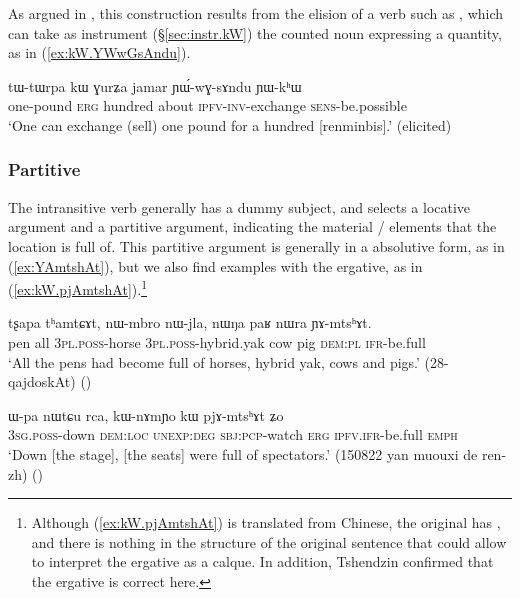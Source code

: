 As argued in \citet[23]{jacques16comparative}, this construction results from the elision of a verb such as , which can take as instrument (§\ref{sec:instr.kW}) the counted noun expressing a quantity, as in (\ref{ex:kW.YWwGsAndu}).


\begin{exe}
\ex \label{ex:kW.YWwGsAndu}
\gll tɯ-tɯrpa kɯ ɣurʑa jamar ɲɯ́-wɣ-sɤndu ɲɯ-kʰɯ \\
one-pound \textsc{erg} hundred about \textsc{ipfv}-\textsc{inv}-exchange \textsc{sens}-be.possible \\
\glt `One can exchange (sell) one pound for a hundred [renminbis].' (elicited)
\end{exe}

\subsubsection{Partitive} \label{sec:kW.mtshAt}
The intransitive verb  generally has a dummy subject, and selects a locative argument and a partitive argument, indicating the material / elements that the location is full of. This partitive argument is generally in a absolutive form, as in (\ref{ex:YAmtshAt}), but we also find examples with the ergative, as in (\ref{ex:kW.pjAmtshAt}).\footnote{Although (\ref{ex:kW.pjAmtshAt}) is translated from Chinese, the original has , and there is nothing in the structure of the original sentence that could allow to interpret the ergative as a calque. In addition, Tshendzin confirmed that the ergative is correct here. }

\begin{exe}
\ex \label{ex:YAmtshAt}
\gll tʂapa tʰamtɕɤt, nɯ-mbro nɯ-jla, nɯŋa paʁ nɯra ɲɤ-mtsʰɤt. \\
pen all \textsc{3pl}.\textsc{poss}-horse \textsc{3pl}.\textsc{poss}-hybrid.yak cow pig \textsc{dem}:\textsc{pl} \textsc{ifr}-be.full \\
\glt `All the pens had become full of horses, hybrid yak, cows and pigs.' (28-qajdoskAt)
()
\end{exe}


\begin{exe}
\ex \label{ex:kW.pjAmtshAt}
\gll  ɯ-pa nɯtɕu rca, kɯ-nɤmɲo kɯ pjɤ-mtsʰɤt ʑo \\
\textsc{3sg}.\textsc{poss}-down \textsc{dem}:\textsc{loc} \textsc{unexp}:\textsc{deg} \textsc{sbj}:\textsc{pcp}-watch \textsc{erg} \textsc{ipfv}.\textsc{ifr}-be.full \textsc{emph} \\
\glt `Down [the stage], [the seats] were full of spectators.' (150822 yan muouxi de ren-zh)
()
\end{exe}

